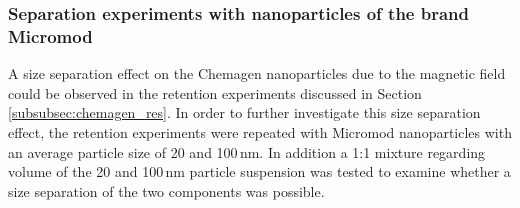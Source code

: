 \FloatBarrier  
\subsubsection{Separation experiments with nanoparticles of the brand Micromod}
\label{subsubsec:micromod_res}
A size separation effect on the Chemagen nanoparticles due to the magnetic field could be observed in the retention experiments discussed in Section\,\ref{subsubsec:chemagen_res}. In order to further investigate this size separation effect, the retention experiments were repeated with Micromod nanoparticles with an average particle size of 20 and 100\,nm. In addition a 1:1 mixture regarding volume of the 20 and 100\,nm particle suspension was tested to examine whether a size separation of the two components was possible. 

\begin{figure}[H]
	

\end{figure}
